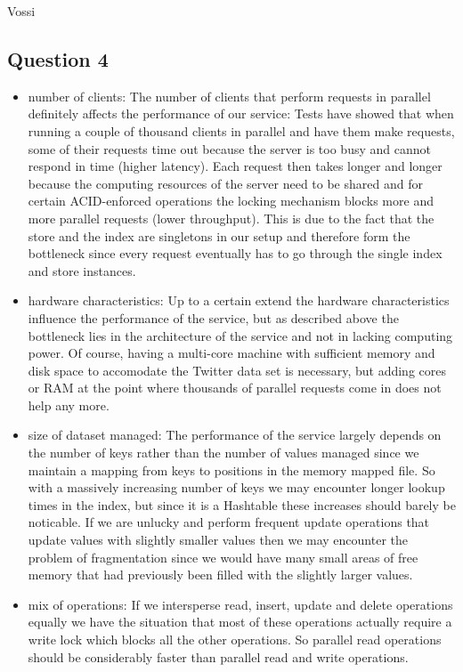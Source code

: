 \documentclass[12pt,a4paper]{article}
\begin{document}
Vossi

\subsection*{Question 4}
\label{sec:pq4}
\begin{itemize}
  \item number of clients: The number of clients that perform requests in parallel definitely affects the performance of our service: Tests have showed that when running a couple of thousand clients in parallel and have them make requests, some of their requests time out because the server is too busy and cannot respond in time (higher latency). Each request then takes longer and longer because the computing resources of the server need to be shared and for certain ACID-enforced operations the locking mechanism blocks more and more parallel requests (lower throughput). This is due to the fact that the store and the index are singletons in our setup and therefore form the bottleneck since every request eventually has to go through the single index and store instances.
  \item hardware characteristics: Up to a certain extend the hardware characteristics influence the performance of the service, but as described above the bottleneck lies in the architecture of the service and not in lacking computing power. Of course, having a multi-core machine with sufficient memory and disk space to accomodate the Twitter data set is necessary, but adding cores or RAM at the point where thousands of parallel requests come in does not help any more.
  \item size of dataset managed: The performance of the service largely depends on the number of keys rather than the number of values managed since we maintain a mapping from keys to positions in the memory mapped file. So with a massively increasing number of keys we may encounter longer lookup times in the index, but since it is a Hashtable these increases should barely be noticable. If we are unlucky and perform frequent update operations that update values with slightly smaller values then we may encounter the problem of fragmentation since we would have many small areas of free memory that had previously been filled with the slightly larger values.
  \item mix of operations: If we intersperse read, insert, update and delete operations equally we have the situation that most of these operations actually require a write lock which blocks all the other operations. So parallel read operations should be considerably faster than parallel read and write operations.
\end{itemize}
\end{document}
